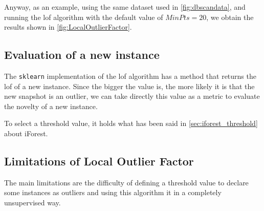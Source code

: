 Anyway, as an example, using the same dataset used in \autoref{fig:dbscandata}, and running the \gls{lof} algorithm with the default value of $MinPts=20$, we obtain the results shown in \autoref{fig:LocalOutlierFactor}.

\subsection{Evaluation of a new instance}
\label{sec:lof_eval}
The \texttt{sklearn} implementation of the \gls{lof} algorithm has a method that returns the \gls{lof} of a new instance. Since the bigger the value is, the more likely it is that the new snapshot is an outlier, we can take directly this value as a metric to evaluate the novelty of a new instance.

To select a threshold value, it holds what has been said in \autoref{sec:iforest_threshold} about iForest.


\subsection{Limitations of Local Outlier Factor}
\label{sec:lof_limitations}
The main limitations are the difficulty of defining a threshold value to declare some instances as outliers and using this algorithm it in a completely unsupervised way.


